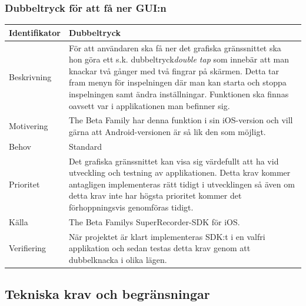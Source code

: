 \subsubsection{Dubbeltryck för att få ner GUI:n}
\begin{tabular}{ | p{65pt} | p{300pt} |}
  \hline
  Identifikator &
  Dubbeltryck
  \\ \hline
  Beskrivning & 
  För att användaren ska få ner det grafiska gränssnittet ska hon göra ett s.k. dubbeltryck\emph{double tap} som innebär att man knackar två gånger med två fingrar på skärmen. Detta tar fram menyn för inspelningen där man kan starta och stoppa inspelningen samt ändra inställningar. Funktionen ska finnas oavsett var i applikationen man befinner sig.
  \\ \hline
  Motivering &
  The Beta Family har denna funktion i sin iOS-version och vill gärna att Android-versionen är så lik den som möjligt.
  \\ \hline
  Behov &
  Standard
  \\ \hline
  Prioritet &
  Det grafiska gränssnittet kan visa sig värdefullt att ha vid utveckling och testning av applikationen. Detta krav kommer antagligen implementeras rätt tidigt i utvecklingen så även om detta krav inte har högsta prioritet kommer det förhoppningsvis genomföras tidigt.
  \\ \hline
  Källa &
  The Beta Familys SuperRecorder-SDK för iOS.
  \\ \hline
  Verifiering &
När projektet är klart implementeras SDK:t i en valfri applikation och sedan testas detta krav genom att dubbelknacka i olika lägen.
  \\ \hline
  \end{tabular}

\subsection{Tekniska krav och begränsningar}
\label{subsec:techreq}


